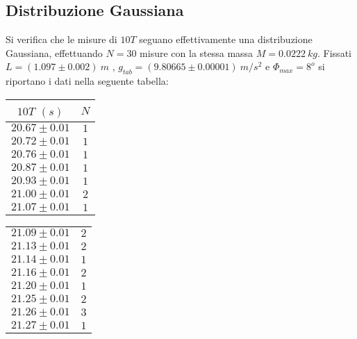 \documentclass[12pt, a4paper]{article}
\begin{document}
\subsection{Distribuzione Gaussiana}
Si verifica che le misure di $10T$ seguano effettivamente una distribuzione Gaussiana, effettuando $N=30$ misure con la stessa massa $M=0.0222 \ kg$.
Fissati $L=(1.097\pm 0.002)\ m$ , $g_{tab}=(9.80665\pm 0.00001)\ m/s^2$ e $\Phi_{max}=8^o$ si riportano i dati nella seguente tabella: 


\begin{table}[!htb]
    \begin{minipage}[t]{.3\linewidth}
    \centering
        \begin{tabular}{|c|c|}
            \hline
            $10T$ $(s)$&$N$\\
            \hline
            $20.67\pm 0.01$ & $1$\\
            $20.72\pm 0.01$ & $1$\\
            $20.76\pm 0.01$ & $1$\\
            $20.87\pm 0.01$ & $1$\\
            $20.93\pm 0.01$ & $1$\\
            $21.00\pm 0.01$ & $2$\\
            $21.07\pm 0.01$ & $1$\\
            \hline
        \end{tabular}
    \end{minipage}
    \begin{minipage}[t]{.3\linewidth}
    \centering
        \begin{tabular}{|c|c|}
            \hline
            
            $21.09\pm 0.01$ & $2$\\
            $21.13\pm 0.01$ & $2$\\
            $21.14\pm 0.01$ & $1$\\
            $21.16\pm 0.01$ & $2$\\
            $21.20\pm 0.01$ & $1$\\
            $21.25\pm 0.01$ & $2$\\
            $21.26\pm 0.01$ & $3$\\
            $21.27\pm 0.01$ & $1$\\
            \hline
        \end{tabular}
    \end{minipage}
    \begin{minipage}[t]{.3\linewidth}
    \centering
        \begin{tabular}{|c|c|}
            \hline
            

\end{tabular}
\end{minipage}
\end{table}
\end{document}
